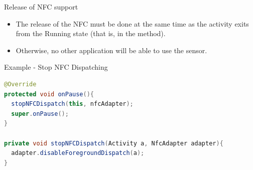 \documentclass{beamer}
\begin{document}
  \begin{frame}{Release of NFC support}
    \begin{itemize}
      \item The release of the NFC must be done at the same time as the activity
      exits from the Running state (that is, in the  method).
      \item Otherwise, no other application will be able to use the sensor.
    \end{itemize}
    \begin{exampleblock}{Example - Stop NFC Dispatching}
      \begin{lstlisting}[language=Java]	
@Override
protected void onPause(){
  stopNFCDispatch(this, nfcAdapter);
  super.onPause();
}

private void stopNFCDispatch(Activity a, NfcAdapter adapter){
  adapter.disableForegroundDispatch(a);
}
      \end{lstlisting}
    \end{exampleblock}
  \end{frame}
\end{document}
